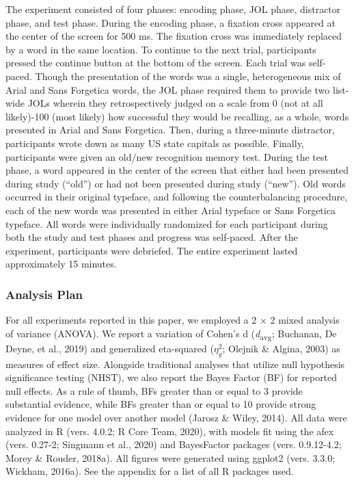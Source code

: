\documentclass[
  english,
  jou]{apa7}
\begin{document}
The experiment consisted of four phases: encoding phase, JOL phase, distractor phase, and test phase. During the encoding phase, a fixation cross appeared at the center of the screen for 500 ms. The fixation cross was immediately replaced by a word in the same location. To continue to the next trial, participants pressed the continue button at the bottom of the screen. Each trial was self-paced. Though the presentation of the words was a single, heterogeneous mix of Arial and Sans Forgetica words, the JOL phase required them to provide two list-wide JOLs wherein they retrospectively judged on a scale from 0 (not at all likely)-100 (most likely) how successful they would be recalling, as a whole, words presented in Arial and Sans Forgetica. Then, during a three-minute distractor, participants wrote down as many US state capitals as possible. Finally, participants were given an old/new recognition memory test. During the test phase, a word appeared in the center of the screen that either had been presented during study (``old'') or had not been presented during study (``new''). Old words occurred in their original typeface, and following the counterbalancing procedure, each of the new words was presented in either Arial typeface or Sans Forgetica typeface. All words were individually randomized for each participant during both the study and test phases and progress was self-paced. After the experiment, participants were debriefed. The entire experiment lasted approximately 15 minutes.

\hypertarget{analysis-plan}{%
\subsubsection{Analysis Plan}\label{analysis-plan}}

For all experiments reported in this paper, we employed a 2 × 2 mixed analysis of variance (ANOVA). We report a variation of Cohen's d (\emph{d}\textsubscript{avg}; Buchanan, De Deyne, et al., 2019) and generalized eta-squared (\(\eta_{g}^{2}\); Olejnik \& Algina, 2003) as measures of effect size. Alongside traditional analyses that utilize null hypothesis significance testing (NHST), we also report the Bayes Factor (BF) for reported null effects. As a rule of thumb, BFs greater than or equal to 3 provide substantial evidence, while BFs greater than or equal to 10 provide strong evidence for one model over another model (Jarosz \& Wiley, 2014). All data were analyzed in R (vers. 4.0.2; R Core Team, 2020), with models fit using the afex (vers. 0.27-2; Singmann et al., 2020) and BayesFactor packages (vers. 0.9.12-4.2; Morey \& Rouder, 2018a). All figures were generated using ggplot2 (vers. 3.3.0; Wickham, 2016a). See the appendix for a list of all R packages used.
\end{document}
